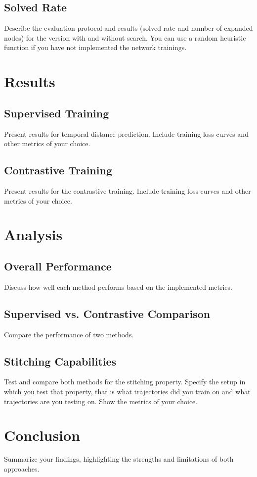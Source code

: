 \documentclass[11pt]{article}
\begin{document}
\subsection{Solved Rate}
Describe the evaluation protocol and results (solved rate and number of expanded nodes) for the version with and without search. You can use a random heuristic function if you have not implemented the network trainings.


\section{Results}

\subsection{Supervised Training}
Present results for temporal distance prediction. Include training loss curves and other metrics of your choice.

\subsection{Contrastive Training}
Present results for the contrastive training. Include training loss curves and other metrics of your choice.


\section{Analysis}

\subsection{Overall Performance}
Discuss how well each method performs based on the implemented metrics.

\subsection{Supervised vs. Contrastive Comparison}
Compare the performance of two methods.

\subsection{Stitching Capabilities}
Test and compare both methods for the stitching property. Specify the setup in which you test that property, that is what trajectories did you train on and what trajectories are you testing on. Show the metrics of your choice.


\section{Conclusion}
Summarize your findings, highlighting the strengths and limitations of both approaches.
\end{document}
